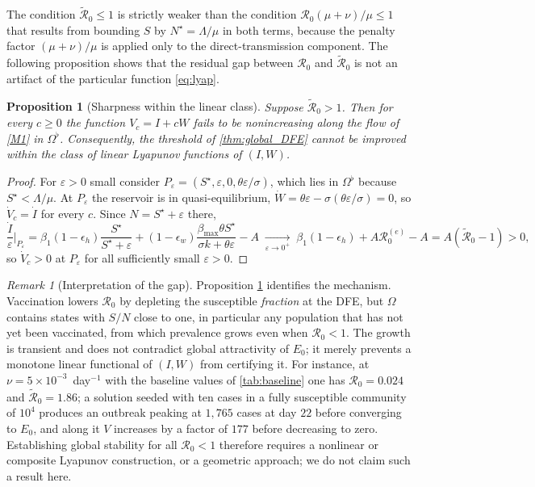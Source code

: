 \documentclass[11pt]{article}
\theoremstyle{plain}
\newtheorem{proposition}[theorem]{Proposition}
\theoremstyle{definition}
\theoremstyle{remark}
\newtheorem{remark}[theorem]{Remark}
\newcommand{\Rz}{\mathcal{R}_0}
\newcommand{\Rze}{\mathcal{R}_0^{(e)}}
\newcommand{\Rtil}{\widetilde{\mathcal{R}}_0}
\begin{document}
The condition $\Rtil\le1$ is strictly weaker than the condition $\Rz(\mu+\nu)/\mu\le1$ that results from bounding $S$ by $N^\star=\Lambda/\mu$ in both terms, because the penalty factor $(\mu+\nu)/\mu$ is applied only to the direct-transmission component. The following proposition shows that the residual gap between $\Rz$ and $\Rtil$ is not an artifact of the particular function \eqref{eq:lyap}.

\begin{proposition}[Sharpness within the linear class]\label{prop:sharp}
Suppose $\Rtil>1$. Then for every $c\ge0$ the function $V_c=I+cW$ fails to be nonincreasing along the flow of \eqref{M1} in $\Omega^\flat$. Consequently, the threshold of \cref{thm:global_DFE} cannot be improved within the class of linear Lyapunov functions of $(I,W)$.
\end{proposition}

\begin{proof}
For $\varepsilon>0$ small consider $P_\varepsilon=(S^\star,\varepsilon,0,\theta\varepsilon/\sigma)$, which lies in $\Omega^\flat$ because $S^\star<\Lambda/\mu$. At $P_\varepsilon$ the reservoir is in quasi-equilibrium, $\dot W=\theta\varepsilon-\sigma(\theta\varepsilon/\sigma)=0$, so $\dot V_c=\dot I$ for every $c$. Since $N=S^\star+\varepsilon$ there,
\[
\frac{\dot I}{\varepsilon}\bigg|_{P_\varepsilon}
=\beta_1(1-\epsilon_h)\frac{S^\star}{S^\star+\varepsilon}
+(1-\epsilon_w)\frac{\beta_{\max}\theta S^\star}{\sigma k+\theta\varepsilon}-A
\;\xrightarrow[\varepsilon\to0^+]{}\;\beta_1(1-\epsilon_h)+A\Rze-A=A(\Rtil-1)>0,
\]
so $\dot V_c>0$ at $P_\varepsilon$ for all sufficiently small $\varepsilon>0$.
\end{proof}

\begin{remark}[Interpretation of the gap]\label{rem:gap}
Proposition \ref{prop:sharp} identifies the mechanism. Vaccination lowers $\Rz$ by depleting the susceptible \emph{fraction} at the DFE, but $\Omega$ contains states with $S/N$ close to one, in particular any population that has not yet been vaccinated, from which prevalence grows even when $\Rz<1$. The growth is transient and does not contradict global attractivity of $E_0$; it merely prevents a monotone linear functional of $(I,W)$ from certifying it. For instance, at $\nu=5\times10^{-3}$~day$^{-1}$ with the baseline values of \cref{tab:baseline} one has $\Rz=0.024$ and $\Rtil=1.86$; a solution seeded with ten cases in a fully susceptible community of $10^4$ produces an outbreak peaking at $1{,}765$ cases at day $22$ before converging to $E_0$, and along it $V$ increases by a factor of $177$ before decreasing to zero. Establishing global stability for all $\Rz<1$ therefore requires a nonlinear or composite Lyapunov construction, or a geometric approach; we do not claim such a result here.
\end{remark}
\end{document}
